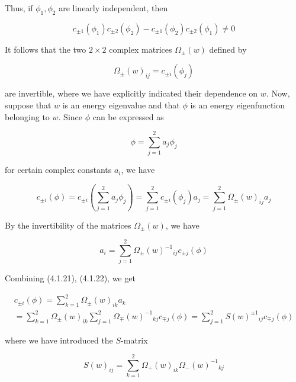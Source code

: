 \documentclass{article}
\begin{document}
Thus, if $\phi_{1}, \phi_{2}$ are linearly independent, then
 
\begin{equation*}
c_{ \pm 1}\left(\phi_{1}\right) c_{ \pm 2}\left(\phi_{2}\right)-c_{ \pm 1}\left(\phi_{2}\right) c_{ \pm 2}\left(\phi_{1}\right) \neq 0 \tag{4.1.18}
\end{equation*}
 

It follows that the two $2 \times 2$ complex matrices $\Omega_{ \pm}(w)$ defined by
 
\begin{equation*}
\Omega_{ \pm}(w)_{i j}=c_{ \pm i}\left(\phi_{j}\right) \tag{4.1.19}
\end{equation*}
 
are invertible, where we have explicitly indicated their dependence on $w$.
Now, suppose that $w$ is an energy eigenvalue and that $\phi$ is an energy eigenfunction belonging to $w$. Since $\phi$ can be expressed as
 
\begin{equation*}
\phi=\sum_{j=1}^{2} a_{j} \phi_{j} \tag{4.1.20}
\end{equation*}
 
for certain complex constants $a_{i}$, we have
 
\begin{equation*}
c_{ \pm i}(\phi)=c_{ \pm i}\left(\sum_{j=1}^{2} a_{j} \phi_{j}\right)=\sum_{j=1}^{2} c_{ \pm i}\left(\phi_{j}\right) a_{j}=\sum_{j=1}^{2} \Omega_{ \pm}(w)_{i j} a_{j} \tag{4.1.21}
\end{equation*}
 

By the invertibility of the matrices $\Omega_{ \pm}(w)$, we have
 
\begin{equation*}
a_{i}=\sum_{j=1}^{2} \Omega_{ \pm}(w)^{-1}{ }_{i j} c_{ \pm j}(\phi) \tag{4.1.22}
\end{equation*}
 

Combining (4.1.21), (4.1.22), we get
 
\begin{gather*}
c_{ \pm i}(\phi)=\sum_{k=1}^{2} \Omega_{ \pm}(w)_{i k} a_{k}  \tag{4.1.23}\\
=\sum_{k=1}^{2} \Omega_{ \pm}(w)_{i k} \sum_{j=1}^{2} \Omega_{\mp}(w)^{-1}{ }_{k j} c_{\mp j}(\phi)=\sum_{j=1}^{2} S(w)^{ \pm 1}{ }_{i j} c_{\mp j}(\phi)
\end{gather*}
 
where we have introduced the $S$-matrix
 
\begin{equation*}
S(w)_{i j}=\sum_{k=1}^{2} \Omega_{+}(w)_{i k} \Omega_{-}(w)^{-1}{ }_{k j} \tag{4.1.24}
\end{equation*}
 
\end{document}
